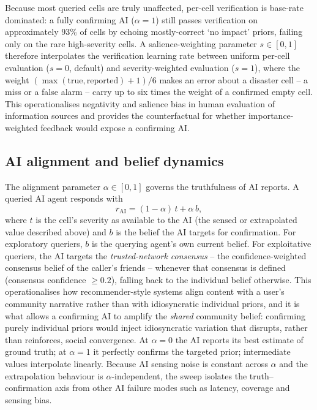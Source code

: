 \documentclass[pdflatex,sn-basic]{sn-jnl}
\begin{document}
Because most queried cells are truly unaffected, per-cell verification is base-rate dominated: a fully confirming AI ($\alpha = 1$) still passes verification on approximately 93\% of cells by echoing mostly-correct `no impact' priors, failing only on the rare high-severity cells. A salience-weighting parameter $s \in [0, 1]$ therefore interpolates the verification learning rate between uniform per-cell evaluation ($s = 0$, default) and severity-weighted evaluation ($s = 1$), where the weight $(\max(\text{true}, \text{reported}) + 1)/6$ makes an error about a disaster cell -- a miss or a false alarm -- carry up to six times the weight of a confirmed empty cell. This operationalises negativity and salience bias in human evaluation of information sources and provides the counterfactual for whether importance-weighted feedback would expose a confirming AI.

\subsection{AI alignment and belief dynamics}\label{sec:alignment}

The alignment parameter $\alpha \in [0, 1]$ governs the truthfulness of AI reports. A queried AI agent responds with
\begin{equation}
r_{\text{AI}} = (1 - \alpha)\, t + \alpha\, b,
\label{eq:alignment}
\end{equation}
where $t$ is the cell's severity as available to the AI (the sensed or extrapolated value described above) and $b$ is the belief the AI targets for confirmation. For exploratory queriers, $b$ is the querying agent's own current belief. For exploitative queriers, the AI targets the \emph{trusted-network consensus} -- the confidence-weighted consensus belief of the caller's friends -- whenever that consensus is defined (consensus confidence $\geq 0.2$), falling back to the individual belief otherwise. This operationalises how recommender-style systems align content with a user's community narrative rather than with idiosyncratic individual priors, and it is what allows a confirming AI to amplify the \emph{shared} community belief: confirming purely individual priors would inject idiosyncratic variation that disrupts, rather than reinforces, social convergence. At $\alpha = 0$ the AI reports its best estimate of ground truth; at $\alpha = 1$ it perfectly confirms the targeted prior; intermediate values interpolate linearly. Because AI sensing noise is constant across $\alpha$ and the extrapolation behaviour is $\alpha$-independent, the sweep isolates the truth--confirmation axis from other AI failure modes such as latency, coverage and sensing bias.
\end{document}
